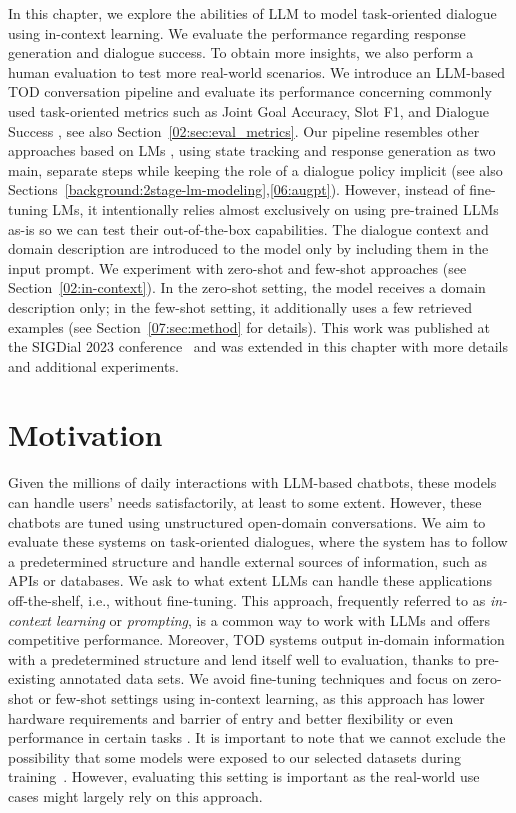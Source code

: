 In this chapter, we explore the abilities of LLM to model task-oriented dialogue using in-context learning.
We evaluate the performance regarding response generation and dialogue success.
To obtain more insights, we also perform a human evaluation to test more real-world scenarios.
We introduce an LLM-based TOD conversation pipeline and evaluate its performance concerning commonly used task-oriented metrics such as Joint Goal Accuracy, Slot F1, and Dialogue Success \cite{rastogi_multi-task_2018,budzianowski_multiwoz_2018}, see also Section~\ref{02:sec:eval_metrics}.
Our pipeline resembles other approaches based on LMs \cite{peng-etal-2021-soloist,yang2021ubar}, using state tracking and response generation as two main, separate steps while keeping the role of a dialogue policy implicit (see also Sections~\ref{background:2stage-lm-modeling},\ref{06:augpt}).
However, instead of fine-tuning LMs, it intentionally relies almost exclusively on using pre-trained LLMs as-is so we can test their out-of-the-box capabilities.
The dialogue context and domain description are introduced to the model only by including them in the input prompt.
We experiment with zero-shot and few-shot approaches (see Section~\ref{02:in-context}).
In the zero-shot setting, the model receives a domain description only; in the few-shot setting, it additionally uses a few retrieved examples (see Section~\ref{07:sec:method} for details).
This work was published at the SIGDial 2023 conference~\cite{hudecek-dusek-2023-large} and was extended in this chapter with more details and additional experiments.

\section{Motivation}
Given the millions of daily interactions with LLM-based chatbots, these models can handle users' needs satisfactorily, at least to some extent.
However, these chatbots are tuned using unstructured open-domain conversations.
We aim to evaluate these systems on task-oriented dialogues, where the system has to follow a predetermined structure and handle external sources of information, such as APIs or databases.
We ask to what extent LLMs can handle these applications off-the-shelf, i.e., without fine-tuning.
This approach, frequently referred to as \emph{in-context learning} or \emph{prompting}, is a common way to work with LLMs and offers competitive performance.
Moreover, TOD systems output in-domain information with a predetermined structure and lend itself well to evaluation, thanks to pre-existing annotated data sets.
We avoid fine-tuning techniques and focus on zero-shot or few-shot settings using in-context learning, as this approach has lower hardware requirements and barrier of entry and better flexibility or even performance in certain tasks \cite{su2022selective}.
It is important to note that we cannot exclude the possibility that some models were exposed to our selected datasets during training~\citep{golchin2023time}.
However, evaluating this setting is important as the real-world use cases might largely rely on this approach.


